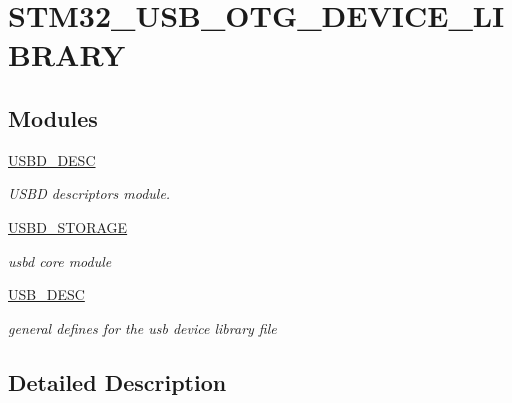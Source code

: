 \hypertarget{group___s_t_m32___u_s_b___o_t_g___d_e_v_i_c_e___l_i_b_r_a_r_y}{}\section{S\+T\+M32\+\_\+\+U\+S\+B\+\_\+\+O\+T\+G\+\_\+\+D\+E\+V\+I\+C\+E\+\_\+\+L\+I\+B\+R\+A\+RY}
\label{group___s_t_m32___u_s_b___o_t_g___d_e_v_i_c_e___l_i_b_r_a_r_y}
\subsection*{Modules}
\begin{DoxyCompactItemize}
\item 
\mbox{\hyperlink{group___u_s_b_d___d_e_s_c}{U\+S\+B\+D\+\_\+\+D\+E\+SC}}
\begin{DoxyCompactList}\small\item\em U\+S\+BD descriptors module. \end{DoxyCompactList}\item 
\mbox{\hyperlink{group___u_s_b_d___s_t_o_r_a_g_e}{U\+S\+B\+D\+\_\+\+S\+T\+O\+R\+A\+GE}}
\begin{DoxyCompactList}\small\item\em usbd core module \end{DoxyCompactList}\item 
\mbox{\hyperlink{group___u_s_b___d_e_s_c}{U\+S\+B\+\_\+\+D\+E\+SC}}
\begin{DoxyCompactList}\small\item\em general defines for the usb device library file \end{DoxyCompactList}\end{DoxyCompactItemize}


\subsection{Detailed Description}
